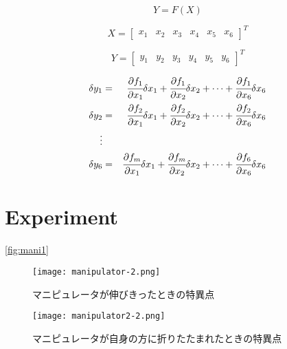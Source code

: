\documentclass [titlepage, a4j, 11pt] {jsarticle}
\begin{document}
\begin{equation}
Y=F(X)
\end{equation}

\begin{equation}
X=
	\begin{bmatrix}
	x_1 &x_2 &x_3 &x_4 &x_5 &x_6
	\end{bmatrix}
^T
\end{equation}

\begin{equation}
Y=
	\begin{bmatrix}
	y_1 &y_2 &y_3 &y_4 &y_5 &y_6
	\end{bmatrix}
^T
\end{equation}

\begin{eqnarray}
\delta y_1&=&\cfrac{\partial f_1}{\partial x_1}\delta x_1+\cfrac{\partial f_1}{\partial x_2}\delta x_2+\cdots+
				\cfrac{\partial f_1}{\partial x_6}\delta x_6 \nonumber \\
\delta y_2&=&\cfrac{\partial f_2}{\partial x_1}\delta x_1+\cfrac{\partial f_2}{\partial x_2}\delta x_2+\cdots+
				\cfrac{\partial f_2}{\partial x_6}\delta x_6 \nonumber \\
\vdots \\
\delta y_6&=&\cfrac{\partial f_m}{\partial x_1}\delta x_1+\cfrac{\partial f_m}{\partial x_2}\delta x_2+\cdots+
				\cfrac{\partial f_6}{\partial x_6}\delta x_6 \nonumber
\end{eqnarray}

\newpage
\section{Experiment}
\ref{fig:mani1}
\begin{figure}[H]
\begin{minipage}{0.5 \hsize}
	\begin{center}
		\texttt{[image: manipulator-2.png]} %
		\caption{マニピュレータが伸びきったときの特異点}
		\label{fig:mani1}
	\end{center}
\end{minipage}
\begin{minipage}{0.5 \hsize}
	\begin{center}
		\texttt{[image: manipulator2-2.png]} %
		\caption{マニピュレータが自身の方に折りたたまれたときの特異点}
		\label{fig:mani2}
	\end{center}
\end{minipage}
\end{figure}
\end{document}
